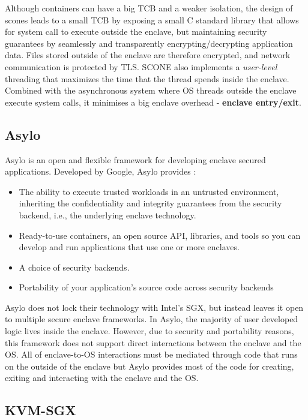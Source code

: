 Although containers can have a big \gls{TCB} and a weaker isolation, the design of scones leads to a small \gls{TCB} by exposing a small C standard library that allows for system call to execute outside the enclave, but maintaining security guarantees by seamlessly and transparently encrypting/decrypting application data. Files stored outside of the enclave are therefore encrypted, and network communication is protected by \gls{TLS}. SCONE also implements a \textit{user-level} threading that maximizes the time that the thread spends inside the enclave. Combined with the asynchronous system where OS threads outside the enclave execute system calls, it minimises a big enclave overhead - \textbf{enclave entry/exit}.

\subsection{Asylo}
\label{ssec:asylo}

Asylo \cite{asylo:1} is an open and flexible framework for developing enclave secured applications. Developed by Google, Asylo provides \cite{asylo:2}:

\begin{itemize}
  \item The ability to execute trusted workloads in an untrusted environment, inheriting the confidentiality and integrity guarantees from the security backend, i.e., the underlying enclave technology.
  \item Ready-to-use containers, an open source API, libraries, and tools so you can develop and run applications that use one or more enclaves.
  \item A choice of security backends.
  \item Portability of your application's source code across security backends
\end{itemize}

Asylo does not lock their technology with Intel's \gls{SGX}, but instead leaves it open to multiple secure enclave frameworks. In Asylo, the majority of user developed logic lives inside the enclave. However, due to security and portability reasons, this framework does not support direct interactions between the enclave and the \gls{OS}. All of enclave-to-OS interactions must be mediated through code that runs on the outside of the enclave but Asylo provides most of the code for creating, exiting and interacting with the enclave and the \gls{OS}.

\subsection{KVM-SGX}
\label{ssec:KVM-SGX}

